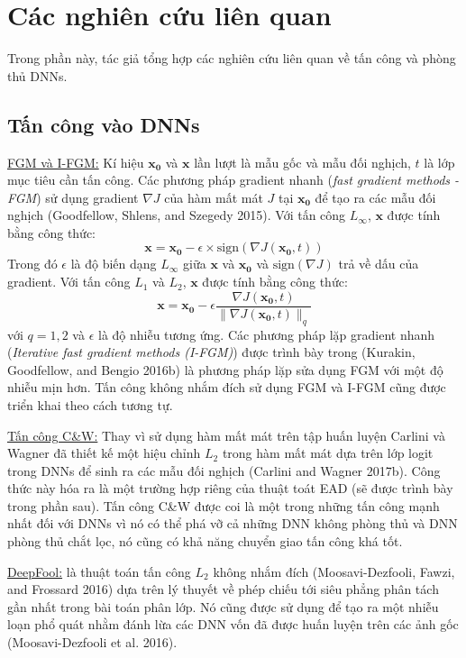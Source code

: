 \chapter{Các nghiên cứu liên quan}
Trong phần này, tác giả tổng hợp các nghiên cứu liên quan về tấn công và phòng thủ DNNs.

\section{Tấn công vào DNNs}
\underline{FGM và I-FGM:} Kí hiệu $\mathbf{x_0}$ và $\mathbf{x}$ lần lượt là mẫu gốc và mẫu đối nghịch,
$t$ là lớp mục tiêu cần tấn công. Các phương pháp gradient nhanh (\textit{fast gradient 
methods - FGM}) sử dụng gradient $\nabla J$ của hàm mất mát $J$ tại $\mathbf{x_0}$
để tạo ra các mẫu đối nghịch (Goodfellow, Shlens, and Szegedy 2015). Với tấn công $L_{\infty}$, 
$\mathbf{x}$ được tính bằng công thức:
\begin{equation}
    \mathbf{x} = \mathbf{x_0} - \epsilon \times \text{sign}(\nabla J(\mathbf{x_0}, t))
    \label{eq:1}
\end{equation}
Trong đó $\epsilon$ là độ biến dạng $L_{\infty}$ giữa $\mathbf{x}$ và $\mathbf{x_0}$ và 
$\text{sign}(\nabla J)$ trả về dấu của gradient. Với tấn công $L_1$ và $L_2$, $\mathbf{x}$ 
được tính bằng công thức:
\begin{equation}
    \mathbf{x} = \mathbf{x_0} - \epsilon \frac{\nabla J(\mathbf{x_0}, t)}
    {\lVert \nabla J(\mathbf{x_0}, t) \rVert _q}
    \label{eq:2}
\end{equation}
với $q = 1,2$ và $\epsilon$ là độ nhiễu tương ứng. Các phương pháp lặp gradient nhanh 
(\textit{Iterative fast gradient methods (I-FGM)}) được trình bày trong (Kurakin, Goodfellow, 
and Bengio 2016b) là phương pháp lặp sửa dụng FGM với một độ nhiễu mịn hơn. Tấn công 
không nhắm đích sử dụng FGM và I-FGM cũng được triển khai theo cách tương tự. 

\underline{Tấn công C\&W:} Thay vì sử dụng hàm mất mát trên tập huấn luyện Carlini và Wagner
đã thiết kế  một hiệu chỉnh $L_2$ trong hàm mất mát dựa trên lớp logit trong DNNs để sinh 
ra các mẫu đối nghịch (Carlini and Wagner 2017b). Công thức này hóa ra là một trường hợp riêng của 
thuật toát EAD (sẽ được trình bày trong phần sau). Tấn công C\&W được coi 
là một trong những tấn công mạnh nhất đối với DNNs vì nó có thể phá vỡ cả những DNN không phòng thủ và DNN phòng thủ chắt lọc, nó cũng có khả năng chuyển giao tấn công khá tốt. 

\underline{DeepFool:} là thuật toán tấn công $L_2$ không nhắm đích (Moosavi-Dezfooli, 
Fawzi, and Frossard 2016) dựa trên lý thuyết về phép chiếu tới siêu phẳng phân tách gần nhất
trong bài toán phân lớp. Nó cũng được sử dụng để tạo ra một nhiễu loạn phổ quát nhằm đánh lừa 
các DNN vốn đã được huấn luyện trên các ảnh gốc (Moosavi-Dezfooli et al. 2016).

